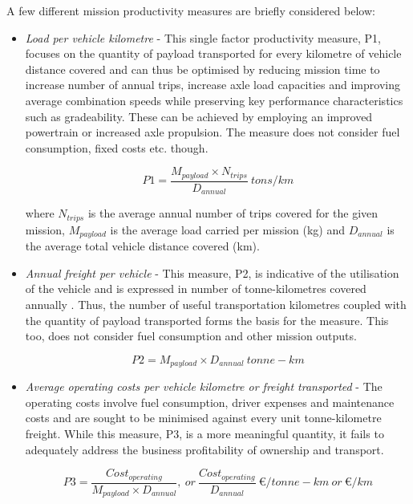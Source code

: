 \documentclass[ExampleMasters.tex]{subfiles}
\begin{document}
		A few different mission productivity measures are briefly considered below:
		\begin{itemize}
			\item \textit{Load per vehicle kilometre} - This single factor productivity measure, P1, focuses on the quantity of payload transported for every kilometre of vehicle distance covered and can thus be optimised by reducing mission time to increase number of annual trips, increase axle load capacities and improving average combination speeds while preserving key performance characteristics such as gradeability. These can be achieved by employing an improved powertrain or increased axle propulsion. The measure does not consider fuel consumption, fixed costs etc. though.

			\begin{equation}
				P1 = \frac{M_{payload} \times N_{trips}}{D_{annual}} \ tons/km
			\end{equation}

			where $N_{trips}$ is the average annual number of trips covered for the given mission, $M_{payload}$ is the average load carried per mission (kg) and $D_{annual}$ is the average total vehicle distance covered (km).

			\item \textit{Annual freight per vehicle} - This measure, P2, is indicative of the utilisation of the vehicle and is expressed in number of tonne-kilometres covered annually \cite{TruckProdAus}. Thus, the number of useful transportation kilometres coupled with the quantity of payload transported forms the basis for the measure. This too, does not consider fuel consumption and other mission outputs.

			\begin{equation}
				P2 = M_{payload} \times D_{annual} \ tonne-km
			\end{equation}

			\item \textit{Average operating costs per vehicle kilometre or freight transported} - The operating costs involve fuel consumption, driver expenses and maintenance costs and are sought to be minimised against every unit tonne-kilometre freight. While this measure, P3, is a more meaningful quantity, it fails to adequately address the business profitability of ownership and transport.

			\begin{equation}
				P3 = \frac{Cost_{operating}}{M_{payload} \times D_{annual}},\ or\ \frac{Cost_{operating}}{D_{annual}} \  \euro/tonne-km \ or \ \euro/km 
			\end{equation}


\end{itemize}
\end{document}
